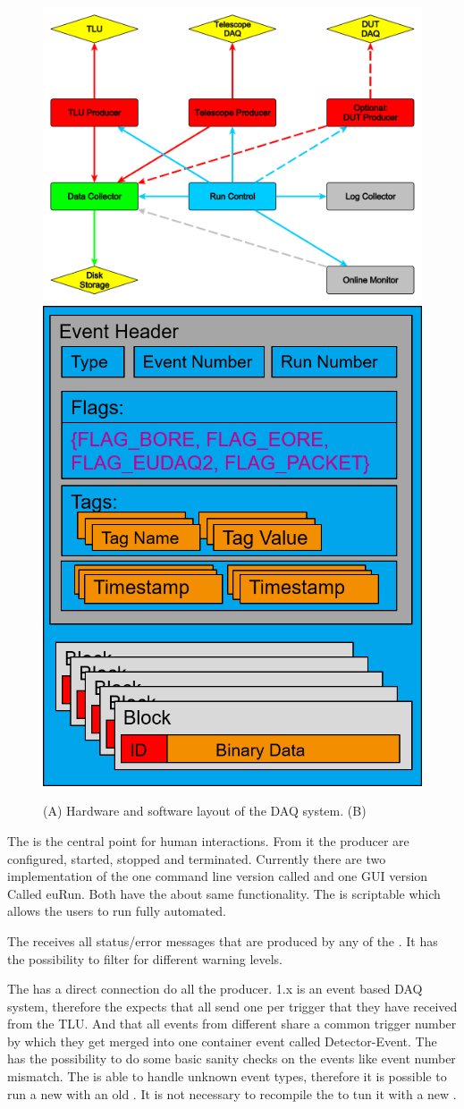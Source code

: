\begin{figure}[tb]
	\center
	\includegraphics[width=.55\textwidth]{figures/eudaq}
	\includegraphics[width=.38\textwidth]{figures/rawdataevent.png}
	\caption[DAQ_System]{(A) Hardware and software layout of the DAQ system. (B) \rawdataevent}
	\label{fig:todo}
\end{figure}

% 	


The \rc is the central point for human interactions. 
From it the producer are configured, started, stopped and terminated. 
Currently there are two implementation of the \rc one command line version called \testrc and one GUI version Called euRun. 
Both have the about same functionality. The \testrc is scriptable which allows the users to run fully automated. 

The \logcollector receives all status/error messages that are produced by any of the \producer. 
It has the possibility to filter for different warning levels. 

The \dc has a direct connection do all the producer. 
\eudaq 1.x is an event based DAQ system, therefore the \dc expects that all \producer send one \event per trigger that they have received from the TLU. 
And that all events from different \producer share a common trigger number by which they get merged into one container event called Detector-Event. 
The \dc has the possibility to do some basic sanity checks on the events like event number mismatch. 
The \dc is able to handle unknown event types, therefore it is possible to run a new \producer with an old \dc. It is not necessary to recompile the \dc to tun it with a new \producer. 

